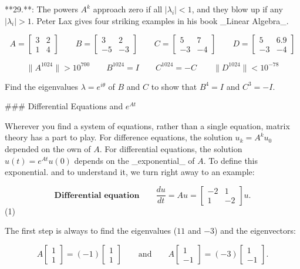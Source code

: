 

**29.**: The powers \(A^{k}\) approach zero if all \(|\lambda_{i}|<1\), and they blow up if any \(|\lambda_{i}|>1\). Peter Lax gives four striking examples in his book _Linear Algebra_.

\[A=\begin{bmatrix}3&2\\ 1&4\end{bmatrix}\qquad B=\begin{bmatrix}3&2\\ -5&-3\end{bmatrix}\qquad C=\begin{bmatrix}5&7\\ -3&-4\end{bmatrix}\qquad D=\begin{bmatrix}5&6.9\\ -3&-4\end{bmatrix}\]

\[\|A^{1024}\|>10^{700}\qquad B^{1024}=I\qquad C^{1024}=-C\qquad\|D^{1024}\|<10^{ -78}\]

Find the eigenvalues \(\lambda=e^{i\theta}\) of \(B\) and \(C\) to show that \(B^{4}=I\) and \(C^{3}=-I\).

### Differential Equations and \(e^{At}\)

Wherever you find a system of equations, rather than a single equation, matrix theory has a part to play. For difference equations, the solution \(u_{k}=A^{k}u_{0}\) depended on the own of \(A\). For differential equations, the solution \(u(t)=e^{At}u(0)\) depends on the _exponential_ of \(A\). To define this exponential. and to understand it, we turn right away to an example:

\[\textbf{Differential equation}\qquad\frac{du}{dt}=Au=\begin{bmatrix}-2&1\\ 1&-2\end{bmatrix}u.\] (1)

The first step is always to find the eigenvalues (\(11\) and \(-3\)) and the eigenvectors:

\[A\begin{bmatrix}1\\ 1\end{bmatrix}=(-1)\begin{bmatrix}1\\ 1\end{bmatrix}\qquad\text{and}\qquad A\begin{bmatrix}1\\ -1\end{bmatrix}=(-3)\begin{bmatrix}1\\ -1\end{bmatrix}.\]

